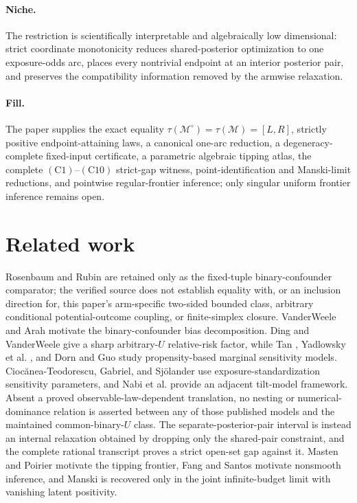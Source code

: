 \documentclass{article}
\begin{document}
\paragraph{Niche.} The restriction is scientifically interpretable and algebraically low dimensional: strict coordinate monotonicity reduces shared-posterior optimization to one exposure-odds arc, places every nontrivial endpoint at an interior posterior pair, and preserves the compatibility information removed by the armwise relaxation.

\paragraph{Fill.} The paper supplies the exact equality \(\tau(\mathcal M^{\circ})=\tau(\mathcal M)=[L,R]\), strictly positive endpoint-attaining laws, a canonical one-arc reduction, a degeneracy-complete fixed-input certificate, a parametric algebraic tipping atlas, the complete \((\mathrm{C1})\)--\((\mathrm{C10})\) strict-gap witness, point-identification and Manski-limit reductions, and pointwise regular-frontier inference; only singular uniform frontier inference remains open.

\section{Related work}

Rosenbaum and Rubin \cite{RosenbaumRubin1983Sensitivity} are retained only as the fixed-tuple binary-confounder comparator; the verified source does not establish equality with, or an inclusion direction for, this paper's arm-specific two-sided bounded class, arbitrary conditional potential-outcome coupling, or finite-simplex closure.  VanderWeele and Arah \cite{VanderWeeleArah2011Bias} motivate the binary-confounder bias decomposition.  Ding and VanderWeele \cite{DingVanderWeele2016WithoutAssumptions} give a sharp arbitrary-\(U\) relative-risk factor, while Tan \cite{Tan2006MarginalSensitivity}, Yadlowsky et al. \cite{YadlowskyEtAl2022Bounds}, and Dorn and Guo \cite{DornGuo2023QuantileBalancing} study propensity-based marginal sensitivity models.  Ciocănea-Teodorescu, Gabriel, and Sjölander \cite{CiocaneaGabrielSjolander2022Marginal} use exposure-standardization sensitivity parameters, and Nabi et al. \cite{NabiEtAl2024SemiparametricSensitivity} provide an adjacent tilt-model framework.  Absent a proved observable-law-dependent translation, no nesting or numerical-dominance relation is asserted between any of those published models and the maintained common-binary-\(U\) class.  The separate-posterior-pair interval is instead an internal relaxation obtained by dropping only the shared-pair constraint, and the complete rational transcript proves a strict open-set gap against it.  Masten and Poirier \cite{MastenPoirier2020BreakdownFrontier} motivate the tipping frontier, Fang and Santos \cite{FangSantos2019InferenceDirectional} motivate nonsmooth inference, and Manski \cite{Manski1990TreatmentResponse} is recovered only in the joint infinite-budget limit with vanishing latent positivity.
\end{document}
